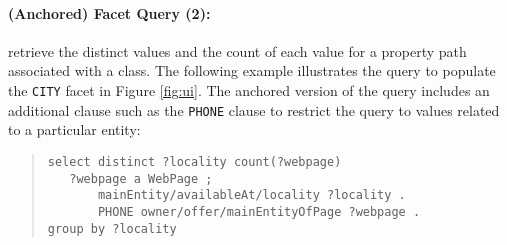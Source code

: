 \paragraph{(Anchored) Facet Query (2):} retrieve the distinct values and the count of each value for a property path associated with a class.
The following example illustrates the query to populate the \verb|CITY| facet in Figure \ref{fig:ui}.
The anchored version of the query includes an additional clause such as the \verb|PHONE| clause to restrict the query to values related to a particular entity:
\begin{quote}
{\footnotesize
\begin{verbatim}
select distinct ?locality count(?webpage)
   ?webpage a WebPage ;
       mainEntity/availableAt/locality ?locality . 
       PHONE owner/offer/mainEntityOfPage ?webpage .
group by ?locality
\end{verbatim}}
\end{quote}
